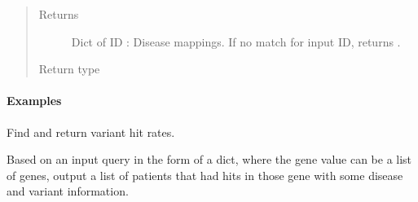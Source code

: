 \documentclass[letterpaper,10pt,english]{sphinxmanual}
\begin{document}
\begin{fulllineitems}
\begin{fulllineitems}
\begin{quote}
\begin{description}
\item[{Returns}] \leavevmode
Dict of ID : Disease mappings. If no match for input ID,
returns .

\item[{Return type}] \leavevmode
{}

\end{description}\end{quote}
\paragraph{Examples}

%
\begin{sphinxVerbatim}[commandchars=\\\{\}]
\end{sphinxVerbatim}

%
\begin{sphinxVerbatim}[commandchars=\\\{\}]
\end{sphinxVerbatim}

\end{fulllineitems}


\begin{fulllineitems}
\label{\detokenize{matchbox_api_utils:matchbox_api_utils.match_data.MatchData.find_variant_frequency}}
Find and return variant hit rates.

Based on an input query in the form of a  dict,
where the gene value can be a list of genes, output a list of patients
that had hits in those gene with some disease and variant information.


\end{fulllineitems}
\end{fulllineitems}
\end{document}
